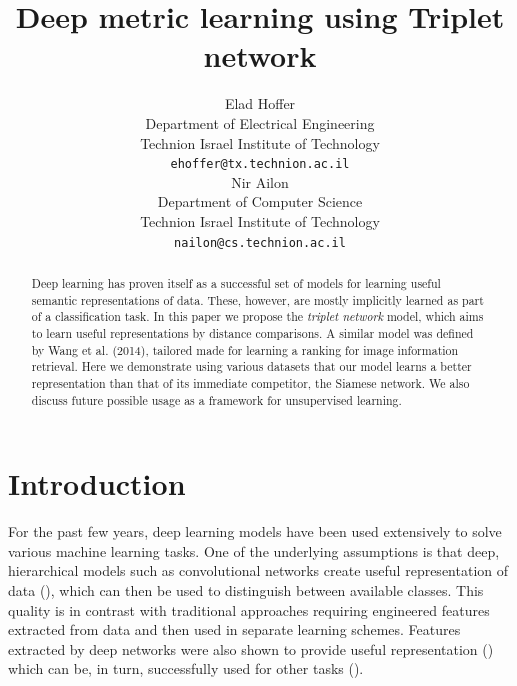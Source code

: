 \documentclass{article} %
\title{Deep metric learning using Triplet network}
\author{
Elad Hoffer \\
Department of Electrical Engineering\\
Technion Israel Institute of Technology\\
\texttt{ehoffer@tx.technion.ac.il} \\
\And
Nir Ailon \\
Department of Computer Science\\
Technion Israel Institute of Technology\\
\texttt{nailon@cs.technion.ac.il}
}
\begin{document}
\maketitle

\begin{abstract}
Deep learning has proven itself as a successful set of models for learning useful semantic representations of data. These, however, are mostly implicitly learned as part of a classification task.
In this paper we propose the \emph{triplet network} model, which aims to learn useful representations by distance comparisons.
A similar model was defined by Wang et al. (2014), tailored made for learning a ranking for image information retrieval.  Here
we demonstrate using various datasets that our model learns a better representation than that of its immediate competitor, the Siamese network.
We also discuss future possible usage as a framework for unsupervised learning.
\end{abstract}


\section{Introduction}
For the past few years, deep learning models have been used extensively to solve various machine learning tasks. One of the underlying assumptions is that deep, hierarchical models such as convolutional networks
create useful representation of data (\citet{Bengio2009,Hinton2007}), which can then be used to distinguish between available classes.
This quality is in contrast with traditional approaches  requiring engineered features extracted from data and then used in separate learning schemes.
Features extracted by deep networks were also shown to provide useful representation (\citet{Zeiler2013,Sermanet}) which can be, in turn, successfully used for other tasks (\citet{Razavian2014}).  %
\end{document}
